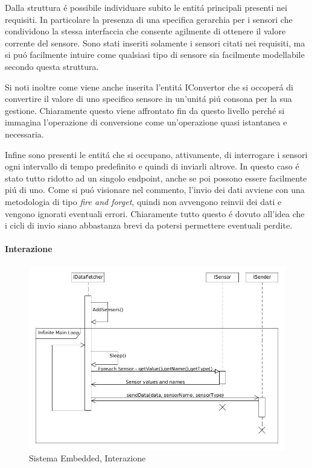 Dalla struttura \'e possibile individuare subito le entit\'a principali presenti nei requisiti. In particolare la presenza di una specifica gerarchia per i sensori che condividono la stessa interfaccia che consente agilmente di ottenere il valore corrente del sensore. Sono stati inseriti solamente i sensori citati nei requisiti, ma si pu\'o facilmente intuire come qualsiasi tipo di sensore sia facilmente modellabile secondo questa struttura.

Si noti inoltre come viene anche inserita l'entit\'a IConvertor che si occoper\'a di convertire il valore di uno specifico sensore in un'unit\'a pi\'u consona per la sua gestione. Chiaramente questo viene affrontato fin da questo livello perch\'e si immagina l'operazione di conversione come un'operazione quasi istantanea e necessaria.

Infine sono presenti le entit\'a che si occupano, attivamente, di interrogare i sensori ogni intervallo di tempo predefinito e quindi di inviarli altrove. In questo caso \'e stato tutto ridotto ad un singolo endpoint, anche se poi possono essere facilmente pi\'u di uno. Come si pu\'o visionare nel commento, l'invio dei dati avviene con una metodologia di tipo \textit{fire and forget}, quindi non avvengono reinvii dei dati e vengono ignorati eventuali errori. Chiaramente tutto questo \'e dovuto all'idea che i cicli di invio siano abbastanza brevi da potersi permettere eventuali perdite.

\paragraph{Interazione}

\begin{figure}[h]
\centering
\includegraphics[width=\textwidth]{Figures/DomainModel/EmbeddedSystem/Interaction}
\caption{Sistema Embedded, Interazione}
\end{figure}

